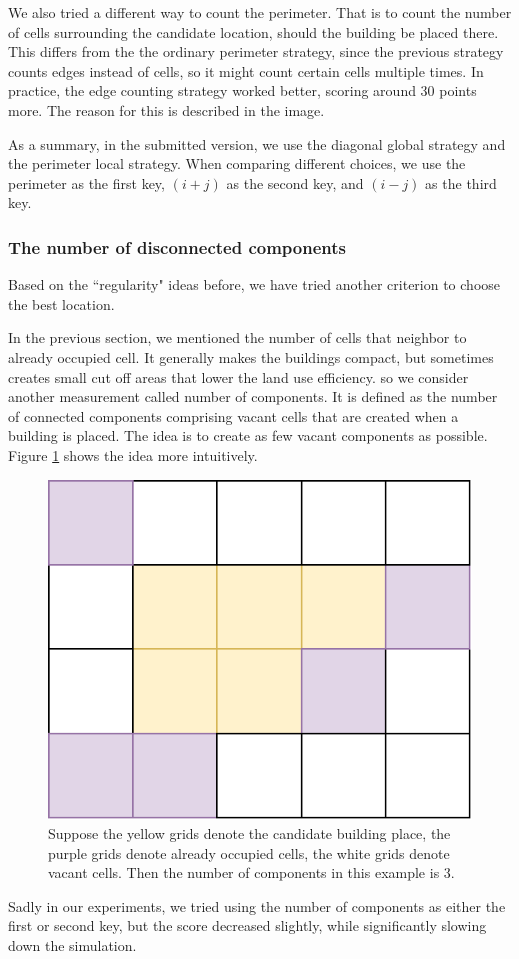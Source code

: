 We also tried a different way to count the perimeter. That is to count the number of cells surrounding the candidate location, should the building be placed there. This differs from the the ordinary perimeter strategy, since the previous strategy counts edges instead of cells, so it might count certain cells multiple times. In practice, the edge counting strategy worked better, scoring around 30 points more. The reason for this is described in the image.

As a summary, in the submitted version, we use the diagonal global strategy and the perimeter local strategy. When comparing different choices, we use the perimeter as the first key, $(i+j)$ as the second key, and $(i-j)$ as the third key.

\subsubsection{The number of disconnected components}

Based on the ``regularity" ideas before, we have tried another criterion to choose the best location.

In the previous section, we mentioned the number of cells that neighbor to already occupied cell. It generally makes the buildings compact, but sometimes creates small cut off areas that lower the land use efficiency. so we consider another measurement called number of components. It is defined as the number of connected components comprising vacant cells that are created when a building is placed. The idea is to create as few vacant components as possible. Figure \ref{fig: numComponents} shows the idea more intuitively.

\begin{figure}
\center
\includegraphics[scale=0.5]{numComponents.pdf}
\caption{
Suppose the yellow grids denote the candidate building place,
the purple grids denote already occupied cells,
the white grids denote vacant cells.
Then the number of components in this example is 3.}
\label{fig: numComponents}
\end{figure}

Sadly in our experiments, we tried using the number of components as either the first or second key, but the score decreased slightly, while significantly slowing down the simulation.
